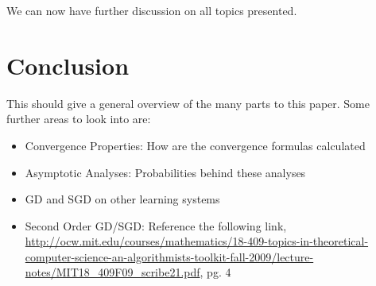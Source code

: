 \documentclass[twoside]{article}
\theoremstyle{definition}
\theoremstyle{definition}
\theoremstyle{remark}
\begin{document}
We can now have further discussion on all topics presented.


\section{Conclusion}

This should give a general overview of the many parts to this paper. Some further areas to look into are:
\begin{itemize}
  \item Convergence Properties: How are the convergence formulas calculated
  \item Asymptotic Analyses: Probabilities behind these analyses
  \item GD and SGD on other learning systems
  \item Second Order GD/SGD: Reference the following link, \url{http://ocw.mit.edu/courses/mathematics/18-409-topics-in-theoretical-computer-science-an-algorithmists-toolkit-fall-2009/lecture-notes/MIT18_409F09_scribe21.pdf}, pg. 4 
\end{itemize}
\end{document}

